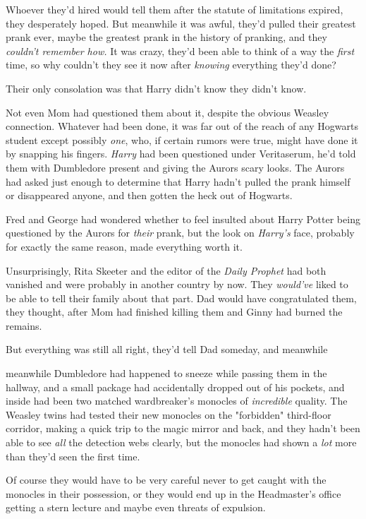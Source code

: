 Whoever they'd hired would tell them after the statute of limitations expired,
they desperately hoped. But meanwhile it was awful, they'd pulled their
greatest prank ever, maybe the greatest prank in the history of pranking, and
they \emph{couldn't remember how.} It was crazy, they'd been able to think of a
way the \emph{first} time, so why couldn't they see it now after \emph{knowing}
everything they'd done?

Their only consolation was that Harry didn't know they didn't know.

Not even Mom had questioned them about it, despite the obvious Weasley
connection. Whatever had been done, it was far out of the reach of any Hogwarts
student{\el} except possibly \emph{one}, who, if certain rumors were true,
might have done it by snapping his fingers. \emph{Harry} had been questioned
under Veritaserum, he'd told them{\el} with Dumbledore present and giving
the Aurors scary looks. The Aurors had asked just enough to determine that
Harry hadn't pulled the prank himself or disappeared anyone, and then gotten
the heck out of Hogwarts.

Fred and George had wondered whether to feel insulted about Harry Potter being
questioned by the Aurors for \emph{their} prank, but the look on \emph{Harry's}
face, probably for exactly the same reason, made everything worth it.

Unsurprisingly, Rita Skeeter and the editor of the \emph{Daily Prophet} had
both vanished and were probably in another country by now. They \emph{would've}
liked to be able to tell their family about that part. Dad would have
congratulated them, they thought, after Mom had finished killing them and Ginny
had burned the remains.

But everything was still all right, they'd tell Dad someday, and
meanwhile{\el}

{\el} meanwhile Dumbledore had happened to sneeze while passing them in the
hallway, and a small package had accidentally dropped out of his pockets, and
inside had been two matched wardbreaker's monocles of \emph{incredible}
quality. The Weasley twins had tested their new monocles on the "forbidden"
third-floor corridor, making a quick trip to the magic mirror and back, and
they hadn't been able to see \emph{all} the detection webs clearly, but the
monocles had shown a \emph{lot} more than they'd seen the first time.

Of course they would have to be very careful never to get caught with the
monocles in their possession, or they would end up in the Headmaster's office
getting a stern lecture and maybe even threats of expulsion.

